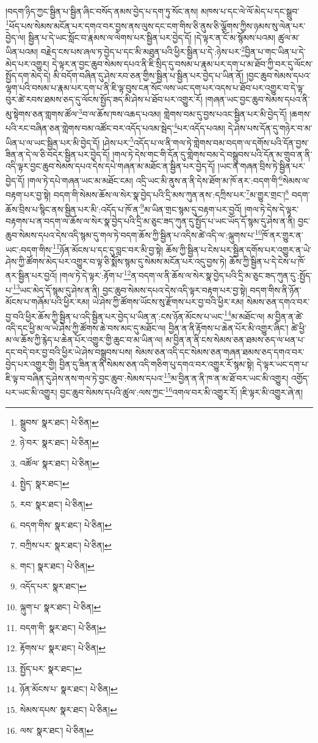།བདག་ཉིད་ཀྱང་སྦྱིན་པ་སྦྱིན་ཞིང་བསོད་ནམས་བྱེད་པ་དག་ཏུ་སོང་ནས། མཁས་པ་དང་ལེ་ལོ་མེད་པ་དང་སྒྲུབ་\footnote{སྒྲུབས་  སྣར་ཐང་།  པེ་ཅིན། }ཕོད་པས་སེམས་མངོན་པར་དགའ་བར་བྱས་ནས་ལུས་དང་ངག་གིས་ཅི་ནུས་ཅི་ལྕོགས་ཀྱིས་ཉམས་སུ་ལེན་པར་བྱེད་ལ། སྦྱིན་པ་དེ་ཡང་སློང་བ་རྣམས་ལ་ལེགས་པར་སྦྱིན་པར་བྱེད་དོ། །དེ་ལྟར་ན་ངོ་མ་སྙོམས་པའམ། ཚུལ་མ་ཡིན་པའམ། བརྗེད་ངས་པས་ཞལ་ཏ་བྱེད་པ་དང་མི་མཐུན་པའི་ཕྱིར་སྦྱིན་པ་དེ་:ཉེས་པར་\footnote{ཉེ་བར་  སྣར་ཐང་།  པེ་ཅིན། }བྱིན་པ་གང་ཡིན་པ་དེ་མེད་པར་འགྱུར། དེ་ལྟར་ན་བྱང་ཆུབ་སེམས་དཔའ་ནི་ཇི་སྲིད་དུ་བསམ་པ་རྣམ་པར་དག་པ་མ་ཐོབ་ཀྱི་བར་དུ་ལོངས་སྤྱོད་དག་མེད་དེ། མི་བདོག་བཞིན་དུ་ཤེས་རབ་ཅན་གྱིས་སྦྱིན་པ་སྦྱིན་པར་བྱེད་པ་ཡིན་ནོ། །བྱང་ཆུབ་སེམས་དཔའ་ལྷག་པའི་བསམ་པ་རྣམ་པར་དག་པ་ནི་ཇི་ལྟ་བུས་ངན་སོང་ལས་ཡང་དག་པར་འདས་པ་ཐོབ་པར་འགྱུར་བ་དེ་ལྟ་བུར་ཚེ་རབས་ཐམས་ཅད་དུ་ལོངས་སྤྱོད་ཟད་མི་ཤེས་པ་ཐོབ་པར་འགྱུར་རོ། །གཞན་ཡང་བྱང་ཆུབ་སེམས་དཔའ་ནི་མུ་སྟེགས་ཅན་གླགས་ཚོལ་\footnote{འཚོལ་  སྣར་ཐང་།  པེ་ཅིན། }བ་ལ་ཆོས་ཁས་འཆད་པའམ། གླེགས་བམ་དུ་བྱས་པའང་སྦྱིན་པར་མི་བྱེད་དོ། །ཆགས་པའི་རང་བཞིན་ཅན་གླེགས་བམ་འཚོང་བར་འདོད་པའམ་སྦེད་\footnote{སྤྱེད་  སྣར་ཐང་། }པར་འདོད་པའམ། དེ་ཤེས་པས་དོན་དུ་གཉེར་བ་མ་ཡིན་པ་ལ་ཡང་སྦྱིན་པར་མི་བྱེད་དོ། །ཤེས་པར་\footnote{རབ་  སྣར་ཐང་།  པེ་ཅིན། }འདོད་པ་ལ་ནི་གལ་ཏེ་གླེགས་བམ་བདག་ལ་དགོས་པའི་དོན་བྱས་ཟིན་ན་དེ་ལ་ཅི་བདེར་སྦྱིན་པར་བྱེད་དོ། །གལ་ཏེ་དེས་གང་གི་དོན་དུ་གླེགས་བམ་དེ་བསྒྲུབས་པའི་དོན་མ་གྲུབ་ན་ནི་འདི་ལྟར་བྱང་ཆུབ་སེམས་དཔའ་དེས་དཔེ་གཞན་མ་མཐོང་ན་སྦྱིན་པར་བྱེད་དོ། །ཡང་ན་གཞན་བྲིས་ཏེ་སྦྱིན་པར་བྱེད་དོ། །གལ་ཏེ་དཔེ་གཞན་ཡང་མ་མཐོང་ངམ། འདྲི་ཡང་མི་ནུས་ན་ནི་དེས་ཐོག་མ་ཁོ་ནར་:བདག་གི་\footnote{བདག་གིས་  སྣར་ཐང་།  པེ་ཅིན། }སེམས་ལ་བརྟག་པར་བྱ་སྟེ། བདག་གི་སེམས་ཆོས་ལ་སེར་སྣ་བྱེད་པའི་དྲི་མས་ཀུན་ནས་:དཀྲིས་པར་\footnote{བཀྲིས་པར་  སྣར་ཐང་།  པེ་ཅིན། }མ་གྱུར་གྲང་།\footnote{གང་།  སྣར་ཐང་།  པེ་ཅིན། } བདག་ཆོས་བྲིས་པ་སྙིང་ནས་སྦྱིན་པར་མི་:འདོད་པ་ཁོ་ན་\footnote{འདོད་པར་  སྣར་ཐང་། }མ་ཡིན་གྲང་སྙམ་དུ་བརྟག་པར་བྱའོ། །གལ་ཏེ་དེས་དེ་ལྟར་བརྟགས་པ་ན་བདག་ལ་ཆོས་ལ་སེར་སྣ་བྱེད་པའི་དྲི་མ་ཅུང་ཟད་ཀུན་དུ་སྤྱོད་པ་ཡང་ཡོད་དོ་སྙམ་དུ་ཤེས་ན་ནི། བྱང་ཆུབ་སེམས་དཔའ་དེས་འདི་སྙམ་དུ་གལ་ཏེ་བདག་ཆོས་ཀྱི་སྦྱིན་པ་འདིས་ཚེ་འདི་ལ་:ལྐུགས་པ་\footnote{ལྐུག་པ་  སྣར་ཐང་།  པེ་ཅིན། }ཁོ་ནར་གྱུར་ན་ཡང་:བདག་གིས་\footnote{བདག་གི་  སྣར་ཐང་།  པེ་ཅིན། }ཉོན་མོངས་པ་དང་དུ་བླང་བར་མི་བྱ་སྟེ། ཆོས་ཀྱི་སྦྱིན་པ་ངེས་པར་སྦྱིན་དགོས་པར་འགྱུར་ན་ཡེ་ཤེས་ཀྱི་ཚོགས་མེད་པར་འགྱུར་བ་ལྟ་ཅི་སྨོས་སྙམ་དུ་སེམས་མངོན་པར་འདུ་བྱས་ཏེ། ཆོས་ཀྱི་སྦྱིན་པ་དེ་ངེས་པ་ཁོ་ནར་སྦྱིན་པར་བྱའོ། །གལ་ཏེ་དེ་ལྟར་:རྟོག་པ་\footnote{རྟོགས་པ་  སྣར་ཐང་།  པེ་ཅིན། }ན་བདག་ལ་ནི་ཆོས་ལ་སེར་སྣ་བྱེད་པའི་དྲི་མ་ཅུང་ཟད་ཀུན་དུ་:སྤྱོད་པ་\footnote{སྤྱོད་པར་  སྣར་ཐང་། }ཡང་མེད་དོ་སྙམ་དུ་ཤེས་ན་ནི། བྱང་ཆུབ་སེམས་དཔའ་དེས་འདི་ལྟར་བརྟག་པར་བྱ་སྟེ། བདག་གིས་ནི་ཉོན་མོངས་པ་གཞོམ་པའི་ཕྱིར་རམ། ཡེ་ཤེས་ཀྱི་ཚོགས་ཡོངས་སུ་རྫོགས་པར་བྱ་བའི་ཕྱིར་རམ། སེམས་ཅན་དགའ་བར་བྱ་བའི་ཕྱིར་ཆོས་ཀྱི་སྦྱིན་པ་འདི་སྦྱིན་པར་བྱེད་པ་ཡིན་ན་:ངས་ཉོན་མོངས་པ་ཡང་\footnote{ཉོན་མོངས་པ་  སྣར་ཐང་།  པེ་ཅིན། }མ་མཐོང་ལ། མ་བྱིན་ན་ཚེ་འདི་དང་ཕྱི་མ་ལ་ཡེ་ཤེས་ཀྱི་ཚོགས་ཆེ་བས་མང་དུ་མཐོང་ལ། བྱིན་ན་ནི་རྟོགས་པ་ཆེན་པོར་མི་འགྱུར་ཞིང་། ཚེ་ཕྱི་མ་ལ་ཆོས་ཀྱི་རྙེད་པ་ཆེན་པོར་འགྱུར་གྱི་ཆུང་བ་མ་ཡིན་ལ། མ་བྱིན་ན་ནི་ངས་སེམས་ཅན་ཐམས་ཅད་ལ་ཕན་པ་དང་བདེ་བར་བྱ་བའི་ཕྱིར་ཡེ་ཤེས་བསྒྲུབས་པས། སེམས་ཅན་འདི་དང་སེམས་ཅན་གཞན་ཐམས་ཅད་དགའ་བར་བྱེད་པར་འགྱུར་གྱི། བྱིན་དུ་ཟིན་ན་ནི་སེམས་ཅན་འདི་གཅིག་པུ་དགའ་བར་འགྱུར་རོ་སྙམ་སྟེ། དེ་ལྟར་ཡང་དག་པ་ཇི་ལྟ་བ་བཞིན་དུ་ཤེས་ནས་གལ་ཏེ་བྱང་ཆུབ་:སེམས་དཔའ་\footnote{སེམས་དཔས་  སྣར་ཐང་།  པེ་ཅིན། }མ་བྱིན་ན་ནི་ཁ་ན་མ་ཐོ་བར་ཡང་མི་འགྱུར། འགྱོད་པར་ཡང་མི་འགྱུར། བྱང་ཆུབ་སེམས་དཔའི་ཚུལ་:ལས་ཀྱང་\footnote{ལས་  སྣར་ཐང་།  པེ་ཅིན། }འགལ་བར་མི་འགྱུར་རོ། །ཇི་ལྟར་མི་འགྱུར་ཞེ་ན། 